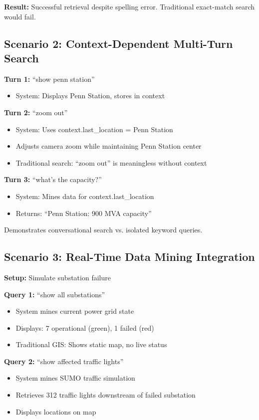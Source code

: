 \documentclass[sigconf]{acmart}
\begin{document}
\textbf{Result:} Successful retrieval despite spelling error. Traditional exact-match search would fail.

\subsection{Scenario 2: Context-Dependent Multi-Turn Search}

\textbf{Turn 1:} ``show penn station''
\begin{itemize}
    \item System: Displays Penn Station, stores in context
\end{itemize}

\textbf{Turn 2:} ``zoom out''
\begin{itemize}
    \item System: Uses context.last\_location = Penn Station
    \item Adjusts camera zoom while maintaining Penn Station center
    \item Traditional search: ``zoom out'' is meaningless without context
\end{itemize}

\textbf{Turn 3:} ``what's the capacity?''
\begin{itemize}
    \item System: Mines data for context.last\_location
    \item Returns: ``Penn Station: 900 MVA capacity''
\end{itemize}

Demonstrates conversational search vs. isolated keyword queries.

\subsection{Scenario 3: Real-Time Data Mining Integration}

\textbf{Setup:} Simulate substation failure

\textbf{Query 1:} ``show all substations''
\begin{itemize}
    \item System mines current power grid state
    \item Displays: 7 operational (green), 1 failed (red)
    \item Traditional GIS: Shows static map, no live status
\end{itemize}

\textbf{Query 2:} ``show affected traffic lights''
\begin{itemize}
    \item System mines SUMO traffic simulation
    \item Retrieves 312 traffic lights downstream of failed substation
    \item Displays locations on map
\end{itemize}
\end{document}
